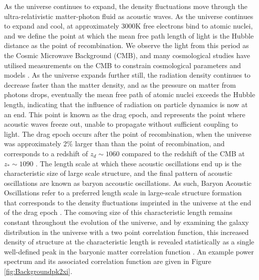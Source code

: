 \documentclass[titlesmallcaps, examinerscopy, copyrightpage]{uqthesis}
\begin{document}
As the universe continues to expand, the density fluctuations move through the ultra-relativistic matter-photon fluid as acoustic waves. As the universe continues to expand and cool, at approximately 3000K free electrons bind to atomic nuclei, and we define the point at which the mean free path length of light is the Hubble distance as the point of recombination. We observe the light from this period as the Cosmic Microwave Background (CMB), and many cosmological studies have utilised measurements on the CMB to constrain cosmological parameters and models \citep{BoggessMather1992,BennettLarson2013,Planck20151}. As the universe expands further still, the radiation density continues to decrease faster than the matter density, and as the pressure on matter from photons drops, eventually the mean free path of atomic nuclei exceeds the Hubble length, indicating that the influence of radiation on particle dynamics is now at an end. This point is known as the drag epoch, and represents the point where acoustic waves freeze out, unable to propagate without sufficient coupling to light. The drag epoch occurs after the point of recombination, when the universe was approximately 2\% larger than than the point of recombination, and corresponds to a redshift of $z_d \sim 1060$ compared to the redshift of the CMB at $z_* \sim 1090$ \cite{Planck2015Parameters}. The length scale at which these acoustic oscillations end up is the characteristic size of large scale structure, and the final pattern of acoustic oscillations are known as baryon accoustic oscillations. As such, Baryon Acoustic Oscillations refer to a preferred length scale in large-scale structure formation that corresponds to the density fluctuations imprinted in the universe at the end of the drag epoch \citep{BondEfstathiou1984, Holtzman1989, HuSugiyama1996, EisensteinHu1998, MeiksinWhitePeacock1999}. The comoving size of this characteristic length remains constant throughout the evolution of the universe, and by examining the galaxy distribution in the universe with a two point correlation function, this increased density of structure at the characteristic length is revealed statistically as a single well-defined peak in the baryonic matter correlation function \citep{Matsubara2004}. An example power spectrum and its associated correlation function are given in Figure \ref{fig:Backgroundpk2xi}.
\end{document}
